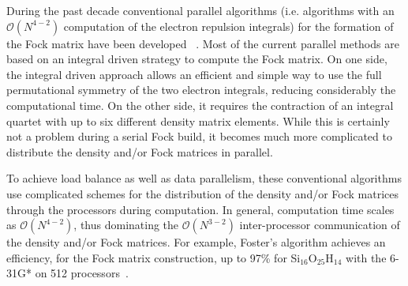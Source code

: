 \documentclass[prl,twocolumn,twocolumngrid,superbib]{revtex4}
\begin{document}
 During the past decade conventional parallel algorithms 
 (i.e. algorithms with an $\mathcal{O}(N^{4-2})$ computation 
 of the electron repulsion integrals) for the 
 formation of the Fock matrix have been developed
 ~\cite{MColvin93,TFurlani95,IFoster96,RHarrison96,YAlexeev02,HTakashima02,RLindh03}.
 Most of the current parallel methods are based on an integral driven strategy
 to compute the Fock matrix. On one side, the integral driven approach
 allows an efficient and simple way to use the full permutational symmetry
 of the two electron integrals, reducing considerably the computational time. 
 On the other side, it requires the contraction of an integral quartet with up to six 
 different density matrix elements.
 While this is certainly not a problem during a serial Fock build, it becomes
 much more complicated to distribute the density and/or Fock matrices in parallel.

 To achieve load balance as well as data parallelism, 
 these conventional algorithms use complicated schemes for the 
 distribution of the density and/or Fock 
 matrices through the processors during computation.
 In general, computation time scales as $\mathcal{O}(N^{4-2})$, thus dominating
 the $\mathcal{O}(N^{3-2})$ inter-processor 
 communication of the density and/or Fock matrices.
 For example, Foster's algorithm achieves an efficiency, for the 
 Fock matrix construction, up to 97\% for Si$_{16}$O$_{25}$H$_{14}$ with 
 the 6-31G* on 512 processors~\cite{RHarrison96}.





\end{document}
